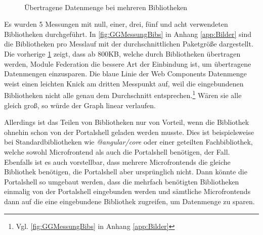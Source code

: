 \begin{figure}[hbt!]
	\begin{minipage}[t]{1\textwidth}	
		\caption{Übertragene Datenmenge bei mehreren Bibliotheken}
		\\ %
		\label{fig:DatenmengeMFWC-WC}
	\end{minipage}
\end{figure}

Es wurden 5 Messungen mit null, einer, drei, fünf und acht verwendeten Bibliotheken durchgeführt. In \cref{fig:GGMessungBibs} in Anhang \ref{app:Bilder} sind die Bibliotheken pro Messlauf mit der durchschnittlichen Paketgröße dargestellt. Die vorherige \cref{fig:DatenmengeMFWC-WC} zeigt, dass ab 800\gls{KB}, welche durch Bibliotheken übertragen werden, Module Federation die bessere Art der Einbindung ist, um übertragene Datenmengen einzusparen. Die blaue Linie der Web Components Datenmenge weist einen leichten Knick am dritten Messpunkt auf, weil die eingebundenen Bibliotheken nicht alle genau dem Durchschnitt entsprechen.\footnote{Vgl. \cref{fig:GGMessungBibs} in Anhang \ref{app:Bilder}} Wären sie alle gleich groß, so würde der Graph linear verlaufen.

Allerdings ist das Teilen von Bibliotheken nur von Vorteil, wenn die Bibliothek ohnehin schon von der Portalshell geladen werden musste. Dies ist beispielsweise bei Standardbibliotheken wie \textit{@angular/core} oder einer geteilten Fachbibliothek, welche sowohl Microfrontend als auch die Portalshell benötigen, der Fall. Ebenfalls ist es auch vorstellbar, dass mehrere Microfrontends die gleiche Bibliothek benötigen, die Portalshell aber ursprünglich nicht. Dann könnte die Portalshell so umgebaut werden, dass die mehrfach benötigten Bibliotheken einmalig von der Portalshell eingebunden werden und sämtliche Microfrontends dann auf die eine eingebundene Bibliothek zugreifen, um Datenmenge zu sparen.


